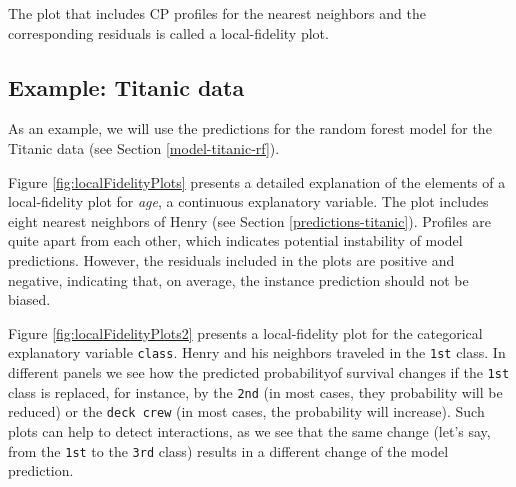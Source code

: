 \documentclass[12pt,]{krantz}
\theoremstyle{definition}
\theoremstyle{definition}
\theoremstyle{definition}
\theoremstyle{remark}
\begin{document}
The plot that includes CP profiles for the nearest neighbors and the
corresponding residuals is called a local-fidelity plot.

\hypertarget{cPLocDiagExample}{%
\subsection{Example: Titanic data}\label{cPLocDiagExample}}

As an example, we will use the predictions for the random forest model
for the Titanic data (see Section \ref{model-titanic-rf}).

Figure \ref{fig:localFidelityPlots} presents a detailed explanation of
the elements of a local-fidelity plot for \emph{age}, a continuous
explanatory variable. The plot includes eight nearest neighbors of Henry
(see Section \ref{predictions-titanic}). Profiles are quite apart from
each other, which indicates potential instability of model predictions.
However, the residuals included in the plots are positive and negative,
indicating that, on average, the instance prediction should not be
biased.

Figure \ref{fig:localFidelityPlots2} presents a local-fidelity plot for
the categorical explanatory variable \texttt{class}. Henry and his
neighbors traveled in the \texttt{1st} class. In different panels we see
how the predicted probabilityof survival changes if the \texttt{1st}
class is replaced, for instance, by the \texttt{2nd} (in most cases,
they probability will be reduced) or the \texttt{deck\ crew} (in most
cases, the probability will increase). Such plots can help to detect
interactions, as we see that the same change (let's say, from the
\texttt{1st} to the \texttt{3rd} class) results in a different change of
the model prediction.
\end{document}
